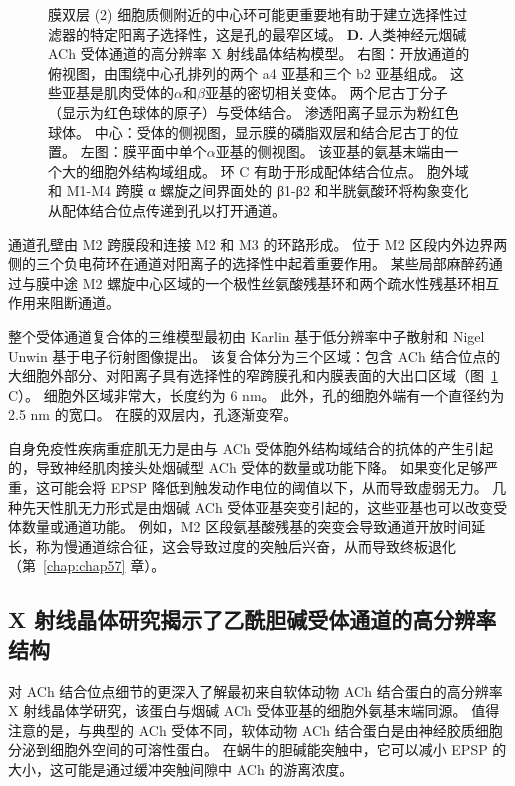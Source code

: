 \begin{figure}[htbp]
{		膜双层 (2) 细胞质侧附近的中心环可能更重要地有助于建立选择性过滤器的特定阳离子选择性，这是孔的最窄区域。
		\textbf{D.} 人类神经元烟碱 ACh 受体通道的高分辨率 X 射线晶体结构模型。
		右图：开放通道的俯视图，由围绕中心孔排列的两个 a4 亚基和三个 b2 亚基组成。
		这些亚基是肌肉受体的$\alpha$和$\beta$亚基的密切相关变体。
		两个尼古丁分子（显示为红色球体的原子）与受体结合。
		渗透阳离子显示为粉红色球体。
		中心：受体的侧视图，显示膜的磷脂双层和结合尼古丁的位置。
		左图：膜平面中单个$\alpha$亚基的侧视图。
		该亚基的氨基末端由一个大的细胞外结构域组成。
		环 C 有助于形成配体结合位点。
		胞外域和 M1-M4 跨膜 α 螺旋之间界面处的 β1-β2 和半胱氨酸环将构象变化从配体结合位点传递到孔以打开通道\cite{morales2016x}。}
	\label{fig:12_11}
\end{figure}


通道孔壁由 M2 跨膜段和连接 M2 和 M3 的环路形成。
位于 M2 区段内外边界两侧的三个负电荷环在通道对阳离子的选择性中起着重要作用。
某些局部麻醉药通过与膜中途 M2 螺旋中心区域的一个极性丝氨酸残基环和两个疏水性残基环相互作用来阻断通道。


整个受体通道复合体的三维模型最初由 Karlin 基于低分辨率中子散射和 Nigel Unwin 基于电子衍射图像提出。
该复合体分为三个区域：包含 ACh 结合位点的大细胞外部分、对阳离子具有选择性的窄跨膜孔和内膜表面的大出口区域（图~\ref{fig:12_11} C）。
细胞外区域非常大，长度约为 6 nm。
此外，孔的细胞外端有一个直径约为 2.5 nm 的宽口。 
在膜的双层内，孔逐渐变窄。


自身免疫性疾病重症肌无力是由与 ACh 受体胞外结构域结合的抗体的产生引起的，导致神经肌肉接头处烟碱型 ACh 受体的数量或功能下降。
如果变化足够严重，这可能会将 EPSP 降低到触发动作电位的阈值以下，从而导致虚弱无力。
几种先天性肌无力形式是由烟碱 ACh 受体亚基突变引起的，这些亚基也可以改变受体数量或通道功能。
例如，M2 区段氨基酸残基的突变会导致通道开放时间延长，称为慢通道综合征，这会导致过度的突触后兴奋，从而导致终板退化（第~\ref{chap:chap57} 章）。



\subsection{X 射线晶体研究揭示了乙酰胆碱受体通道的高分辨率结构}

对 ACh 结合位点细节的更深入了解最初来自软体动物 ACh 结合蛋白的高分辨率 X 射线晶体学研究，该蛋白与烟碱 ACh 受体亚基的细胞外氨基末端同源。
值得注意的是，与典型的 ACh 受体不同，软体动物 ACh 结合蛋白是由神经胶质细胞分泌到细胞外空间的可溶性蛋白。
在蜗牛的胆碱能突触中，它可以减小 EPSP 的大小，这可能是通过缓冲突触间隙中 ACh 的游离浓度。



